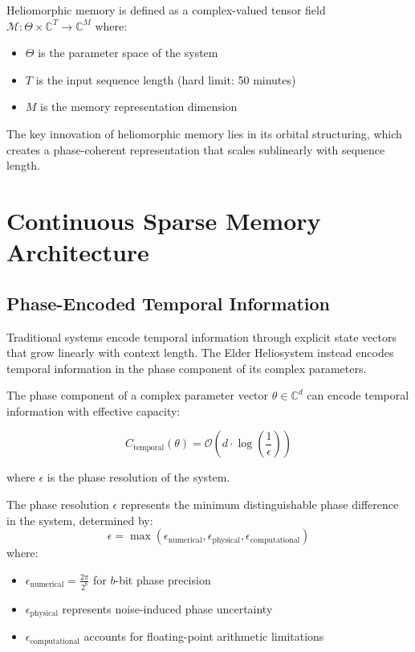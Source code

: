 \begin{definition}
Heliomorphic memory is defined as a complex-valued tensor field $\mathcal{M}: \Theta \times \mathbb{C}^T \rightarrow \mathbb{C}^M$ where:
\begin{itemize}
    \item $\Theta$ is the parameter space of the system
    \item $T$ is the input sequence length (hard limit: 50 minutes)
    \item $M$ is the memory representation dimension
\end{itemize}
\end{definition}

The key innovation of heliomorphic memory lies in its orbital structuring, which creates a phase-coherent representation that scales sublinearly with sequence length.

\section{Continuous Sparse Memory Architecture}

\subsection{Phase-Encoded Temporal Information}

Traditional systems encode temporal information through explicit state vectors that grow linearly with context length. The Elder Heliosystem instead encodes temporal information in the phase component of its complex parameters.

\begin{theorem}
The phase component of a complex parameter vector $\theta \in \mathbb{C}^d$ can encode temporal information with effective capacity:

\begin{equation}
C_{\text{temporal}}(\theta) = \mathcal{O}(d \cdot \log(\frac{1}{\epsilon}))
\end{equation}

where $\epsilon$ is the phase resolution of the system.
\end{theorem}

\begin{definition}
The phase resolution $\epsilon$ represents the minimum distinguishable phase difference in the system, determined by:
\begin{equation}
\epsilon = \max\left(\epsilon_{\text{numerical}}, \epsilon_{\text{physical}}, \epsilon_{\text{computational}}\right)
\end{equation}
where:
\begin{itemize}
    \item $\epsilon_{\text{numerical}} = \frac{2\pi}{2^b}$ for $b$-bit phase precision
    \item $\epsilon_{\text{physical}}$ represents noise-induced phase uncertainty
    \item $\epsilon_{\text{computational}}$ accounts for floating-point arithmetic limitations
\end{itemize}
\end{definition}

